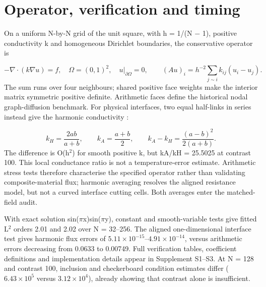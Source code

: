 \documentclass[10pt]{article}
\begin{document}
\section{Operator, verification and timing}
On a uniform N-by-N grid of the unit square, with h = 1/(N \ensuremath{-} 1), positive conductivity k and homogeneous Dirichlet boundaries, the conservative operator is\par
\begin{equation}
-\nabla\!\cdot(k\nabla u)=f,\quad \Omega=(0,1)^2,\quad u|_{\partial\Omega}=0,\qquad (Au)_i=h^{-2}\!\sum_{j\sim i}k_{ij}(u_i-u_j).
\end{equation}
The sum runs over four neighbours; shared positive face weights make the interior matrix symmetric positive definite. Arithmetic faces define the historical nodal graph-diffusion benchmark. For physical interfaces, two equal half-links in series instead give the harmonic conductivity \cite{Patankar1980}:\par
\begin{equation}
k_H=\frac{2ab}{a+b},\qquad k_A=\frac{a+b}{2},\qquad k_A-k_H=\frac{(a-b)^2}{2(a+b)}.
\end{equation}
The difference is O(h\ensuremath{^{2}}) for smooth positive k, but kA/kH = 25.5025 at contrast 100. This local conductance ratio is not a temperature-error estimate. Arithmetic stress tests therefore characterise the specified operator rather than validating composite-material flux; harmonic averaging resolves the aligned resistance model, but not a curved interface cutting cells. Both averages enter the matched-field audit.\par
With exact solution sin(\ensuremath{\pi}x)sin(\ensuremath{\pi}y), constant and smooth-variable tests give fitted L\ensuremath{^{2}} orders 2.01 and 2.02 over N = 32--256. The aligned one-dimensional interface test gives harmonic flux errors of \ensuremath{5.11\times10^{-15}}--\ensuremath{4.91\times10^{-14}}, versus arithmetic errors decreasing from 0.0633 to 0.00749. Full verification tables, coefficient definitions and implementation details appear in Supplement S1--S3. At N = 128 and contrast 100, inclusion and checkerboard condition estimates differ (\ensuremath{6.43\times10^{5}} versus \ensuremath{3.12\times10^{4}}), already showing that contrast alone is insufficient.\par
\end{document}
